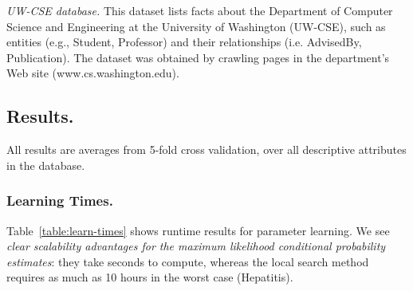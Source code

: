 \documentclass[twoside,leqno,twocolumn]{article}
\begin{document}


\emph{UW-CSE database.} This dataset lists facts about the Department of Computer Science and Engineering at the University of Washington (UW-CSE), such as entities (e.g., Student, Professor) and their relationships (i.e. AdvisedBy, Publication).
The dataset was obtained  by crawling pages in the department's Web site (www.cs.washington.edu). 


\subsection{Results.}

All results are averages from 5-fold cross validation, over all descriptive attributes in the database. 

\subsubsection{Learning Times.}
Table~\ref{table:learn-times} shows runtime results for parameter learning. We see {\em clear scalability advantages for the maximum likelihood conditional probability estimates}: they take seconds to compute, whereas the local search method requires as much as 10 hours in the worst case (Hepatitis).
\end{document}
